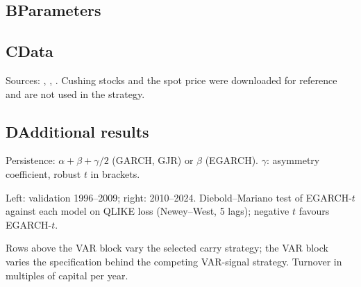 \documentclass[10pt,a4paper]{article}
\newcommand{\tabnote}[1]{\par\vspace{2pt}\begin{minipage}{\linewidth}\scriptsize\color{muted}#1\end{minipage}}
\begin{document}
\subsection*{B\quad Parameters}
\begin{table}[H]
\centering\small
\caption{Frozen configuration (\texttt{config/strategy.yaml})}

\end{table}

\subsection*{C\quad Data}
\begin{table}[H]
\centering\small
\caption{Raw data files, as downloaded on 15 November 2026 (\texttt{data/raw/MANIFEST.json})}

\tabnote{Sources: \citet{eiafutures}, \citet{eiastocks}, \citet{fred}. Cushing stocks and the spot price were downloaded for reference and are not used in the strategy.}
\end{table}

\subsection*{D\quad Additional results}
\begin{table}[H]
\centering\small
\begin{minipage}[t]{0.47\linewidth}\centering
\caption{GARCH specifications, 1985--2009}\label{tab:volspecs}
\resizebox{\linewidth}{!}{}
\tabnote{Persistence: $\alpha+\beta+\gamma/2$ (GARCH, GJR) or $\beta$ (EGARCH). $\gamma$: asymmetry coefficient, robust $t$ in brackets.}
\end{minipage}\hfill
\begin{minipage}[t]{0.5\linewidth}\centering
\caption{One-day variance forecasts}\label{tab:voleval}
\resizebox{\linewidth}{!}{}
\tabnote{Left: validation 1996--2009; right: 2010--2024. Diebold--Mariano test of EGARCH-$t$ against each model on QLIKE loss (Newey--West, 5 lags); negative $t$ favours EGARCH-$t$.}
\end{minipage}
\end{table}

\begin{table}[H]
\centering\small
\caption{One-at-a-time robustness}\label{tab:robust}

\tabnote{Rows above the VAR block vary the selected carry strategy; the VAR block varies the specification behind the competing VAR-signal strategy. Turnover in multiples of capital per year.}
\end{table}
\end{document}

